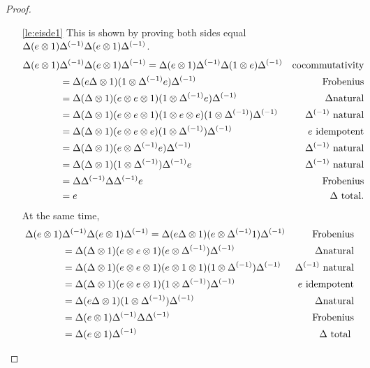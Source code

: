 \begin{proof}
  \prepprooflist
  \begin{enumerate}[{(}i{)}]
    \item[\vref{le:eisde1}]This is shown by proving both sides
      equal $\Delta (e\otimes 1) {\Delta}^{(-1)} \Delta (e\otimes 1) {\Delta}^{(-1)}$.
      \begin{align*}
        \Delta (e\otimes 1) &{\Delta}^{(-1)} \Delta (e\otimes 1) {\Delta}^{(-1)}
        = \Delta (e\otimes 1) {\Delta}^{(-1)} \Delta (1\otimes e) {\Delta}^{(-1)}&\text{cocommutativity}\\
        &=\Delta(e \Delta \otimes 1) (1\otimes{\Delta}^{(-1)} e) {\Delta}^{(-1)} &\text{Frobenius}\\
        &=\Delta(\Delta \otimes 1) (e\otimes e\otimes1) (1\otimes{\Delta}^{(-1)}e){\Delta}^{(-1)}&\Delta\text{natural}\\
        &=\Delta(\Delta \otimes 1) (e\otimes e\otimes1) (1\otimes e\otimes e)(1\otimes{\Delta}^{(-1)}){\Delta}^{(-1)}&{\Delta}^{(-1)}\text{ natural}\\
        &=\Delta (\Delta \otimes1) (e\otimes e\otimes e)(1\otimes {\Delta}^{(-1)}){\Delta}^{(-1)}&e\text{ idempotent}\\
        &=\Delta (\Delta \otimes1) (e\otimes {\Delta}^{(-1)}e){\Delta}^{(-1)}&{\Delta}^{(-1)}\text{ natural}\\
        &=\Delta (\Delta \otimes1) (1\otimes {\Delta}^{(-1)}){\Delta}^{(-1)}e&{\Delta}^{(-1)}\text{ natural}\\
        &=\Delta {\Delta}^{(-1)}\Delta {\Delta}^{(-1)}e&\text{Frobenius}\\
        &=e&\Delta\text{ total}.
      \end{align*}
      At the same time,
      \begin{align*}
        \Delta (e\otimes 1) &{\Delta}^{(-1)} \Delta (e\otimes 1) {\Delta}^{(-1)}
        =\Delta(e \Delta \otimes 1) (e\otimes{\Delta}^{(-1)} 1) {\Delta}^{(-1)} &\text{Frobenius}\\
        &=\Delta(\Delta \otimes 1) (e\otimes e\otimes1) (e\otimes{\Delta}^{(-1)}){\Delta}^{(-1)}&\Delta\text{natural}\\
        &=\Delta(\Delta \otimes 1) (e\otimes e\otimes1) (e\otimes1\otimes1)(1\otimes{\Delta}^{(-1)}){\Delta}^{(-1)}&{\Delta}^{(-1)}\text{ natural}\\
        &=\Delta (\Delta \otimes1) (e\otimes e\otimes 1)(1\otimes {\Delta}^{(-1)}){\Delta}^{(-1)}&e\text{ idempotent}\\
        &=\Delta  (e\Delta\otimes 1)(1\otimes{\Delta}^{(-1)}){\Delta}^{(-1)}&\Delta\text{natural}\\
        &=\Delta (e \otimes 1) {\Delta}^{(-1)}\Delta{\Delta}^{(-1)} &\text{Frobenius}\\
        &=\Delta (e \otimes 1) {\Delta}^{(-1)} &\Delta\text{ total}\
      \end{align*}

\end{enumerate}
\end{proof}
